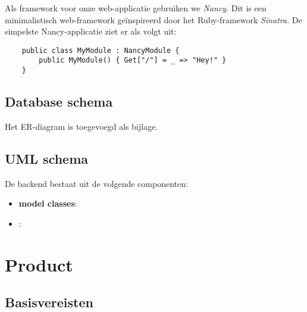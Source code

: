 \documentclass[12pt,a4paper]{article}
\begin{document}
Als framework voor onze web-applicatie gebruiken we \textit{Nancy}. Dit is een 
minimalistisch web-framework ge\"inspireerd door het Ruby-framework 
\textit{Sinatra}. De simpelste Nancy-applicatie ziet er als volgt uit:

\begin{lstlisting}
    public class MyModule : NancyModule {
        public MyModule() { Get["/"] = _ => "Hey!" }
    }
\end{lstlisting}


\subsection{Database schema}
Het ER-diagram is toegevoegd als bijlage.

\subsection{UML schema}

De backend bestaat uit de volgende componenten:

\begin{itemize}

\item \textbf{model classes}:  

\item \textbf{}:

\end{itemize}

\section{Product}

\subsection{Basisvereisten}
\end{document}
